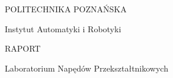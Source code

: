 \begin{titlepage}
	\begin{center}
	\fontsize{28pt}{28pt}\selectfont
	
POLITECHNIKA POZNAŃSKA
	
  \vspace*{12mm}
	
		\fontsize{24pt}{24pt}\selectfont

Instytut Automatyki i Robotyki
	
	 \vspace*{5mm}
	
\begin{figure}[!htb]
\centering
  \label{fig:PPLogo}
\end{figure} 
	

	\vspace*{5mm}

	
	\fontsize{24pt}{24pt}\selectfont
RAPORT \\
	
		\fontsize{18pt}{18pt}\selectfont
	\vspace*{4mm}
  
 Laboratorium Napędów Przekształtnikowych
		\fontsize{14pt}{14pt}\selectfont
	\vspace*{8mm}


\end{center}
\end{titlepage}
